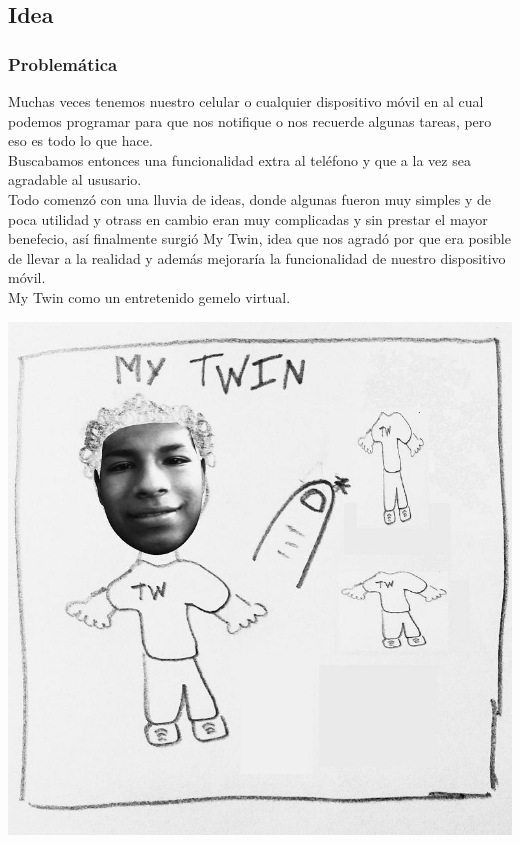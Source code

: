 \documentclass[10pt]{article}
\begin{document}
{{\begin{flushleft}
\subsection{Idea}
\subsubsection{Problem\'atica}
Muchas veces tenemos nuestro celular o cualquier dispositivo m\'ovil en al cual podemos programar para que nos notifique o nos recuerde algunas tareas, pero eso es todo lo que hace.\\
Buscabamos entonces una funcionalidad extra al tel\'efono y que a la vez sea agradable al ususario.\\
Todo comenz\'o con una lluvia de ideas, donde algunas fueron muy simples y de poca utilidad y otrass en cambio eran muy complicadas y sin prestar el mayor benefecio, as\'i finalmente surgi\'o My Twin, idea que nos agrad\'o por que era posible de llevar a la realidad y adem\'as mejorar\'ia la funcionalidad de nuestro dispositivo m\'ovil.\\
My Twin como un entretenido gemelo virtual.\\
\vspace{0.3in}
\begin{center}
\includegraphics[scale=0.35]{bosquejoI1}
\end{center}


\end{flushleft}}}
\end{document}
